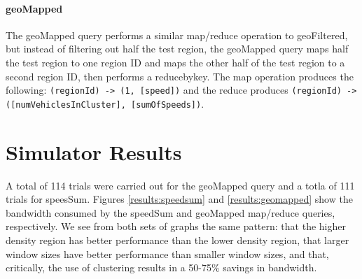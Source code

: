 \documentclass{thesis}
\begin{document}
    \paragraph{geoMapped}
        The geoMapped query performs a similar map/reduce operation to geoFiltered, but instead of filtering out half the
        test region, the geoMapped query maps half the test region to one region ID and maps the other half of the
        test region to a second region ID, then performs a reducebykey. The map operation produces the following:
        \verb|(regionId) -> (1, [speed])| and the reduce produces \verb|(regionId) -> ([numVehiclesInCluster], [sumOfSpeeds])|.

\section{Simulator Results}

   A total of 114 trials were carried out for the geoMapped query and a totla of 111 trials for speesSum.
   Figures \ref{results:speedsum} and \ref{results:geomapped} show the bandwidth consumed by the speedSum
   and geoMapped map/reduce queries, respectively. We see from both sets of graphs the same pattern: that
   the higher density region has better performance than the lower density region, that larger window
   sizes have better performance than smaller window sizes, and that, critically, the use of clustering
   results in a 50-75\% savings in bandwidth.
\end{document}
